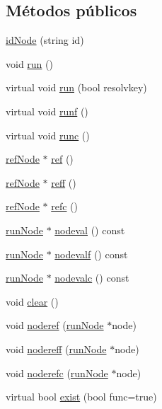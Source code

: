 \subsection*{Métodos públicos}
\begin{DoxyCompactItemize}
\item 
\hyperlink{classidNode_a0babfa8cabd86c11c3a4f625732d4c8d}{id\-Node} (string id)
\item 
void \hyperlink{classidNode_a720f6ab623192e93743e0098db5d7af7}{run} ()
\item 
virtual void \hyperlink{classidNode_a4492461c45b78b905757f2ecf97fc393}{run} (bool resolvkey)
\item 
virtual void \hyperlink{classidNode_a61b9528de4bb06f924dc60e9b682705e}{runf} ()
\item 
virtual void \hyperlink{classidNode_af1376fbb468dea9a953ce499a0e94d3d}{runc} ()
\item 
\hyperlink{classrefNode}{ref\-Node} $\ast$ \hyperlink{classidNode_ae46892d8bd8e5521922f7090f3336839}{ref} ()
\item 
\hyperlink{classrefNode}{ref\-Node} $\ast$ \hyperlink{classidNode_a7c354169bc6e38d433d11be645bb64a9}{reff} ()
\item 
\hyperlink{classrefNode}{ref\-Node} $\ast$ \hyperlink{classidNode_a806975a98cecd6fc2e416fff4b356ea1}{refc} ()
\item 
\hyperlink{classrunNode}{run\-Node} $\ast$ \hyperlink{classidNode_a69900402f8bfbe33559854cddf1bd0f9}{nodeval} () const 
\item 
\hyperlink{classrunNode}{run\-Node} $\ast$ \hyperlink{classidNode_a93d0147c1fd593831162bcb9a8dce671}{nodevalf} () const 
\item 
\hyperlink{classrunNode}{run\-Node} $\ast$ \hyperlink{classidNode_a1b7033729a1e2857eb0f18690aa616bb}{nodevalc} () const 
\item 
void \hyperlink{classidNode_aed42c343bc2be05c7b15114600cee491}{clear} ()
\item 
void \hyperlink{classidNode_a718cba1385de599875f8cc14f52f6c84}{noderef} (\hyperlink{classrunNode}{run\-Node} $\ast$node)
\item 
void \hyperlink{classidNode_a866c23e34133608ff9bd902e4561535d}{nodereff} (\hyperlink{classrunNode}{run\-Node} $\ast$node)
\item 
void \hyperlink{classidNode_a96747b61c1ea4c75e055485bc3fe678b}{noderefc} (\hyperlink{classrunNode}{run\-Node} $\ast$node)
\item 
virtual bool \hyperlink{classidNode_a54667580929eab413d46ff5d3c7b3345}{exist} (bool func=true)

\end{DoxyCompactItemize}

